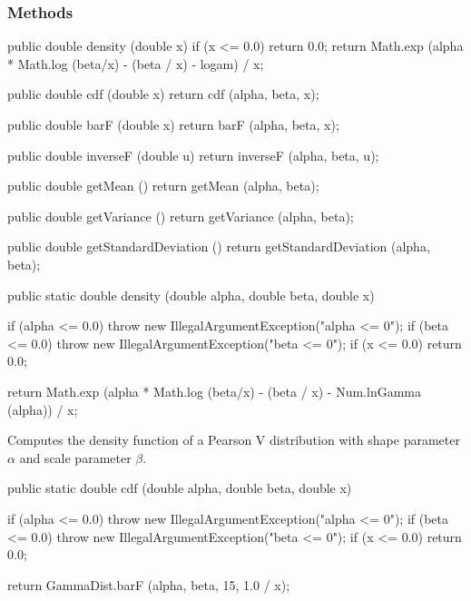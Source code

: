\subsubsection* {Methods}
\begin{code}\begin{hide}

   public double density (double x) {
      if (x <= 0.0)
         return 0.0;
      return Math.exp (alpha * Math.log (beta/x) - (beta / x) - logam) / x;
   }

   public double cdf (double x) {
      return cdf (alpha, beta, x);
   }

   public double barF (double x) {
      return barF (alpha, beta, x);
   }

   public double inverseF (double u) {
      return inverseF (alpha, beta, u);
   }

   public double getMean () {
      return getMean (alpha, beta);
   }

   public double getVariance () {
      return getVariance (alpha, beta);
   }

   public double getStandardDeviation () {
      return getStandardDeviation (alpha, beta);
   }\end{hide}

   public static double density (double alpha, double beta, double x)\begin{hide} {
      if (alpha <= 0.0)
         throw new IllegalArgumentException("alpha <= 0");
      if (beta <= 0.0)
         throw new IllegalArgumentException("beta <= 0");
      if (x <= 0.0)
         return 0.0;

      return Math.exp (alpha * Math.log (beta/x) - (beta / x) - Num.lnGamma (alpha)) / x;
   }\end{hide}
\end{code}
\begin{tabb}
   Computes the density function of a Pearson V distribution with shape
parameter $\alpha$
   and scale parameter $\beta$.
\end{tabb}
\begin{code}

   public static double cdf (double alpha, double beta, double x)\begin{hide} {
      if (alpha <= 0.0)
         throw new IllegalArgumentException("alpha <= 0");
      if (beta <= 0.0)
         throw new IllegalArgumentException("beta <= 0");
      if (x <= 0.0)
         return 0.0;

      return GammaDist.barF (alpha, beta, 15, 1.0 / x);
   }\end{hide}
\end{code}
